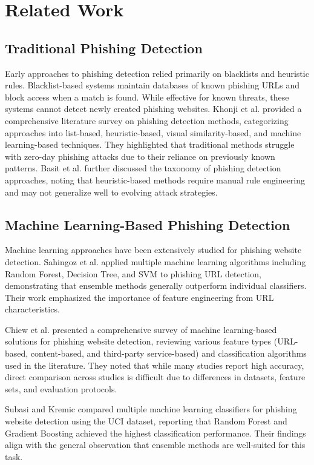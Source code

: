 \documentclass[conference]{IEEEtran}
\begin{document}
\section{Related Work}

\subsection{Traditional Phishing Detection}

Early approaches to phishing detection relied primarily on blacklists and heuristic rules. Blacklist-based systems maintain databases of known phishing URLs and block access when a match is found. While effective for known threats, these systems cannot detect newly created phishing websites. Khonji et al. \cite{khonji2013} provided a comprehensive literature survey on phishing detection methods, categorizing approaches into list-based, heuristic-based, visual similarity-based, and machine learning-based techniques. They highlighted that traditional methods struggle with zero-day phishing attacks due to their reliance on previously known patterns. Basit et al. \cite{basit2021} further discussed the taxonomy of phishing detection approaches, noting that heuristic-based methods require manual rule engineering and may not generalize well to evolving attack strategies.

\subsection{Machine Learning-Based Phishing Detection}

Machine learning approaches have been extensively studied for phishing website detection. Sahingoz et al. \cite{sahingoz2019} applied multiple machine learning algorithms including Random Forest, Decision Tree, and SVM to phishing URL detection, demonstrating that ensemble methods generally outperform individual classifiers. Their work emphasized the importance of feature engineering from URL characteristics.

Chiew et al. \cite{chiew2021} presented a comprehensive survey of machine learning-based solutions for phishing website detection, reviewing various feature types (URL-based, content-based, and third-party service-based) and classification algorithms used in the literature. They noted that while many studies report high accuracy, direct comparison across studies is difficult due to differences in datasets, feature sets, and evaluation protocols.

Subasi and Kremic \cite{subasi2020} compared multiple machine learning classifiers for phishing website detection using the UCI dataset, reporting that Random Forest and Gradient Boosting achieved the highest classification performance. Their findings align with the general observation that ensemble methods are well-suited for this task.
\end{document}
